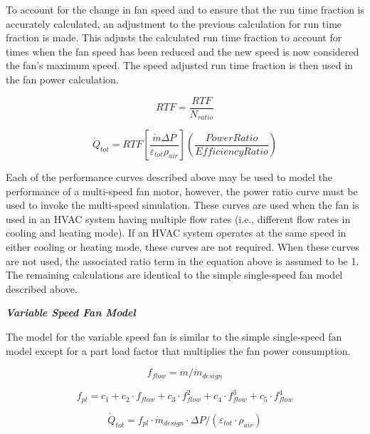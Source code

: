 To account for the change in fan speed and to ensure that the run time fraction is accurately calculated, an adjustment to the previous calculation for run time fraction is made. This adjusts the calculated run time fraction to account for times when the fan speed has been reduced and the new speed is now considered the fan's maximum speed. The speed adjusted run time fraction is then used in the fan power calculation.

\begin{equation}
RTF = \frac{RTF}{N_{ratio}}
\end{equation}

\begin{equation}
{\dot{Q}_{tot}} = RTF\left[ {\frac{{\dot{m} \Delta P}}{{{\varepsilon_{tot}}{\rho_{air}}}}} \right]\left( {\frac{{PowerRatio}}{{EfficiencyRatio}}} \right)
\end{equation}

Each of the performance curves described above may be used to model the performance of a multi-speed fan motor, however, the power ratio curve must be used to invoke the multi-speed simulation. These curves are used when the fan is used in an HVAC system having multiple flow rates (i.e., different flow rates in cooling and heating mode). If an HVAC system operates at the same speed in either cooling or heating mode, these curves are not required. When these curves are not used, the associated ratio term in the equation above is assumed to be 1. The remaining calculations are identical to the simple single-speed fan model described above.

\emph{\textbf{Variable Speed Fan Model}}

The model for the variable speed fan is similar to the simple single-speed fan model except for a part load factor that multiplies the fan power consumption.

\begin{equation}
{f_{flow}} = \dot m/{\dot m_{design}}
\end{equation}

\begin{equation}
{f_{pl}} = {c_1} + {c_2} \cdot {f_{flow}} + {c_3} \cdot f_{flow}^2 + {c_4} \cdot f_{flow}^3 + {c_5} \cdot f_{flow}^4
\end{equation}

\begin{equation}
{\dot Q_{tot}} = {f_{pl}}\cdot {\dot m_{design}}\cdot \Delta P/\left( {{\varepsilon_{tot}}\cdot {\rho_{air}}} \right)
\end{equation}

